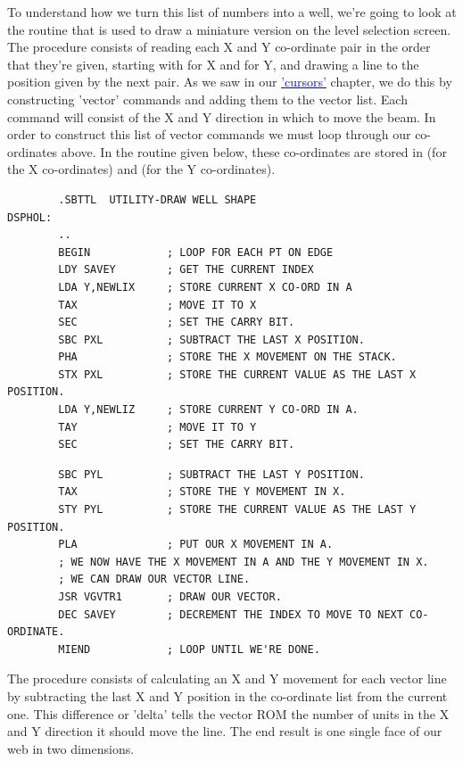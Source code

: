 To understand how we turn this list of numbers into a well, we're going to look
at the routine that is used to draw a miniature version on the level selection screen.
The procedure consists of reading each X and Y co-ordinate pair in the order that they're
given, starting with  for X and  for Y, and drawing a line to the 
position given by the next pair. As we saw in our 
\hyperref[sec:cursors]{\textcolor{blue}{'cursors'}}
chapter, we do this by constructing 'vector' commands and adding them to the vector list.
Each command will consist of the X and Y direction in which to move the beam. In order to
construct this list of vector commands we must loop through our co-ordinates above. In the
routine given below, these co-ordinates are stored in  (for the X co-ordinates)
and  (for the Y co-ordinates).

\begin{lstlisting}
        .SBTTL  UTILITY-DRAW WELL SHAPE
DSPHOL:
        ..
        BEGIN            ; LOOP FOR EACH PT ON EDGE
        LDY SAVEY        ; GET THE CURRENT INDEX
        LDA Y,NEWLIX     ; STORE CURRENT X CO-ORD IN A
        TAX              ; MOVE IT TO X
        SEC              ; SET THE CARRY BIT.
        SBC PXL          ; SUBTRACT THE LAST X POSITION.
        PHA              ; STORE THE X MOVEMENT ON THE STACK.
        STX PXL          ; STORE THE CURRENT VALUE AS THE LAST X POSITION.
        LDA Y,NEWLIZ     ; STORE CURRENT Y CO-ORD IN A.
        TAY              ; MOVE IT TO Y
        SEC              ; SET THE CARRY BIT.
\end{lstlisting}
\begin{lstlisting}
        SBC PYL          ; SUBTRACT THE LAST Y POSITION.
        TAX              ; STORE THE Y MOVEMENT IN X.
        STY PYL          ; STORE THE CURRENT VALUE AS THE LAST Y POSITION.
        PLA              ; PUT OUR X MOVEMENT IN A.
        ; WE NOW HAVE THE X MOVEMENT IN A AND THE Y MOVEMENT IN X.
        ; WE CAN DRAW OUR VECTOR LINE.
        JSR VGVTR1       ; DRAW OUR VECTOR.
        DEC SAVEY        ; DECREMENT THE INDEX TO MOVE TO NEXT CO-ORDINATE.
        MIEND            ; LOOP UNTIL WE'RE DONE.
\end{lstlisting}

The procedure consists of calculating an X and Y movement for each vector line by 
subtracting the last X and Y position in the co-ordinate list from the current one.
This difference or 'delta' tells the vector ROM the number of units in the X and Y
direction it should move the line. The end result is one single face of our web
in two dimensions.

